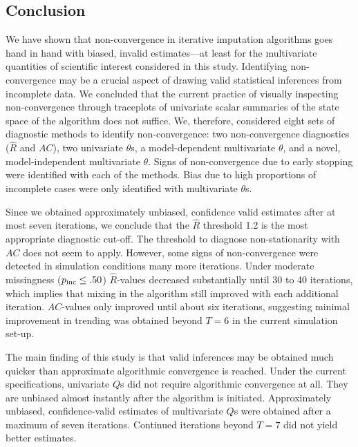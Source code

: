\documentclass[Royal,times,sageh]{sagej}
\begin{document}
\hypertarget{conclusion}{%
\subsection{Conclusion}\label{conclusion}}

We have shown that non-convergence in iterative imputation algorithms goes hand in hand with biased, invalid estimates---at least for the multivariate quantities of scientific interest considered in this study. Identifying non-convergence may be a crucial aspect of drawing valid statistical inferences from incomplete data. We concluded that the current practice of visually inspecting non-convergence through traceplots of univariate scalar summaries of the state space of the algorithm does not suffice. We, therefore, considered eight sets of diagnostic methods to identify non-convergence: two non-convergence diagnostics (\(\widehat{R}\) and \(AC\)), two univariate \(\theta\)s, a model-dependent multivariate \(\theta\), and a novel, model-independent multivariate \(\theta\). Signs of non-convergence due to early stopping were identified with each of the methods. Bias due to high proportions of incomplete cases were only identified with multivariate \(\theta\)s.

Since we obtained approximately unbiased, confidence valid estimates after at most seven iterations, we conclude that the \(\widehat{R}\) threshold 1.2 is the most appropriate diagnostic cut-off. The threshold to diagnose non-stationarity with \(AC\) does not seem to apply. However, some signs of non-convergence were detected in simulation conditions many more iterations. Under moderate missingness (\(p_{\rm inc}\leq.50\)) \(\widehat{R}\)-values decreased substantially until 30 to 40 iterations, which implies that mixing in the algorithm still improved with each additional iteration. \(AC\)-values only improved until about six iterations, suggesting minimal improvement in trending was obtained beyond \(T=6\) in the current simulation set-up.

The main finding of this study is that valid inferences may be obtained much quicker than approximate algorithmic convergence is reached. Under the current specifications, univariate \(Q\)s did not require algorithmic convergence at all. They are unbiased almost instantly after the algorithm is initiated. Approximately unbiased, confidence-valid estimates of multivariate \(Q\)s were obtained after a maximum of seven iterations. Continued iterations beyond \(T = 7\) did not yield better estimates.
\end{document}

